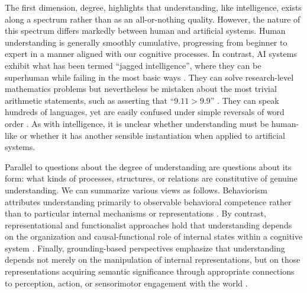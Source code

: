 \documentclass{article}
\begin{document}
The first dimension, degree, highlights that understanding, like intelligence, exists along a spectrum rather than as an all-or-nothing quality.
However, the nature of this spectrum differs markedly between human and artificial systems.
Human understanding is generally smoothly cumulative, progressing from beginner to expert in a manner aligned with our cognitive processes.
In contrast, AI systems exhibit what has been termed ``jagged intelligence'', where they can be superhuman while failing in the most basic ways \cite{DellAcqua2023JaggedFrontier, Karpathy2024JaggedIntelligence}.
They can solve research-level mathematics problems but nevertheless be mistaken about the most trivial arithmetic statements, such as asserting that ``$9.11 > 9.9$'' \cite{openai_why_9pt11_larger_2024}.
They can speak hundreds of languages, yet are easily confused under simple reversals of word order \cite{berglund2024the}.
As with intelligence, it is unclear whether understanding must be human-like or whether it has another sensible instantiation when applied to artificial systems.

Parallel to questions about the degree of understanding are questions about its form: what kinds of processes, structures, or relations are constitutive of genuine understanding.
We can summarize various views as follows.
Behaviorism attributes understanding primarily to observable behavioral competence rather than to particular internal mechanisms or representations \cite{Ryle1949ConceptMind}.
By contrast, representational and functionalist approaches hold that understanding depends on the organization and causal-functional role of internal states within a cognitive system \cite{Fodor1975,Putnam1967}.
Finally, grounding-based perspectives emphasize that understanding depends not merely on the manipulation of internal representations, but on those representations acquiring semantic significance through appropriate connections to perception, action, or sensorimotor engagement with the world \cite{Harnad1990SymbolGrounding}.
\end{document}
